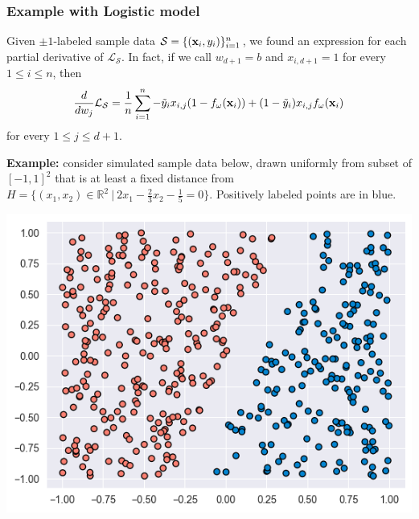 \documentclass{beamer}
\theoremstyle{example}
\begin{document}
\begin{frame}
    \frametitle{Example with Logistic model}
    Given $\pm1$-labeled sample data $\mathcal S= \{({\bf x}_i, y_i)\}_{i=1}^n$, we found an expression for each partial derivative of $\mathcal L_{\mathcal S}$. In fact, if we call $w_{d+1} = b$ and $x_{i,d+1} = 1$ for every $1\le i\le n$, then 
        {\small 
        \[\frac{d}{dw_{j}}\mathcal L_{\mathcal S} = \frac1n\sum_{i=1}^n-\tilde y_ix_{i,j}(1-f_{\omega}({\bf x}_i)) + (1-\tilde y_i)x_{i,j}f_{\omega}({\bf x}_i)\]
        }
    for every $1\le j\le d+1$.

    \textbf{Example:} consider simulated sample data below, drawn uniformly from subset of $[-1,1]^2$ that is at least a fixed distance from $H = \{(x_1,x_2)\in\mathbb R^2\ |\ 2x_1 - \frac23x_2 - \frac15=0\}$. Positively labeled points are in blue. 
    \vspace*{11pt}

    \centering
    \includegraphics[height=0.3\textheight]{../../Images/simulated-logregression-data.png}
\end{frame}
\end{document}
